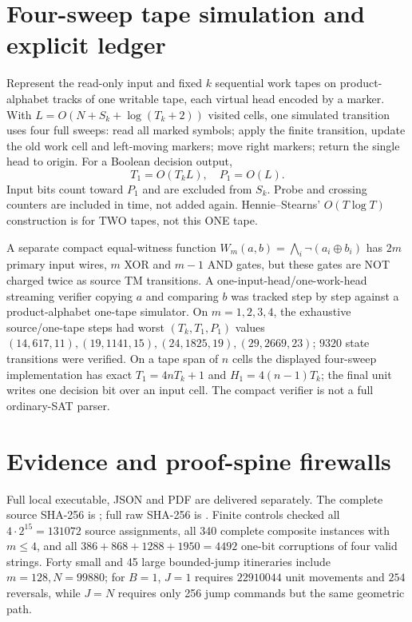 \documentclass[11pt]{article}
\begin{document}
\section{Four-sweep tape simulation and explicit ledger}
Represent the read-only input and fixed $k$ sequential work tapes on product-alphabet tracks of one writable tape, each virtual head encoded by a marker. With $L=O(N+S_k+\log(T_k+2))$ visited cells, one simulated transition uses four full sweeps: read all marked symbols; apply the finite transition, update the old work cell and left-moving markers; move right markers; return the single head to origin. For a Boolean decision output,
\[
T_1=O(T_kL),\quad P_1=O(L).
\]
Input bits count toward $P_1$ and are excluded from $S_k$. Probe and crossing counters are included in time, not added again. Hennie--Stearns' $O(T\log T)$ construction is for TWO tapes, not this ONE tape.

A separate compact equal-witness function $W_m(a,b)=\bigwedge_i\neg(a_i\oplus b_i)$ has $2m$ primary input wires, $m$ XOR and $m-1$ AND gates, but these gates are NOT charged twice as source TM transitions. A one-input-head/one-work-head streaming verifier copying $a$ and comparing $b$ was tracked step by step against a product-alphabet one-tape simulator. On $m=1,2,3,4$, the exhaustive source/one-tape steps had worst $(T_k,T_1,P_1)$ values $(14,617,11),(19,1141,15),(24,1825,19),(29,2669,23)$; $9320$ state transitions were verified. On a tape span of $n$ cells the displayed four-sweep implementation has exact $T_1=4nT_k+1$ and $H_1=4(n-1)T_k$; the final unit writes one decision bit over an input cell. The compact verifier is not a full ordinary-SAT parser.

\section{Evidence and proof-spine firewalls}
Full local executable, JSON and PDF are delivered separately. The complete source SHA-256 is
; full raw SHA-256 is
.
Finite controls checked all $4\cdot2^{15}=131072$ source assignments, all 340 complete composite instances with $m\le4$, and all $386+868+1288+1950=4492$ one-bit corruptions of four valid strings. Forty small and 45 large bounded-jump itineraries include $m=128,N=99880$; for $B=1$, $J=1$ requires $22910044$ unit movements and $254$ reversals, while $J=N$ requires only 256 jump commands but the same geometric path.
\end{document}

